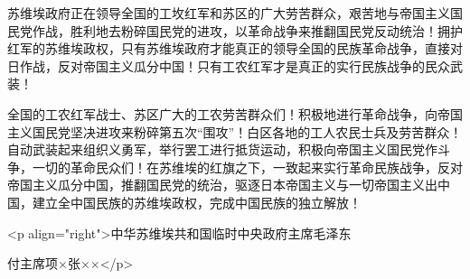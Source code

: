 苏维埃政府正在领导全国的工坆红军和苏区的广大劳苦群众，艰苦地与帝国主义国民党作战，胜利地去粉碎国民党的进攻，以革命战争来推翻国民党反动统治！拥护红军的苏维埃政权，只有苏维埃政府才能真正的领导全国的民族革命战争，直接对日作战，反对帝国主义瓜分中国！只有工农红军才是真正的实行民族战争的民众武装！

全国的工农红军战士、苏区广大的工农劳苦群众们！积极地进行革命战争，向帝国主义国民党坚决进攻来粉碎第五次“围攻”！白区各地的工人农民士兵及劳苦群众！自动武装起来组织义勇军，举行罢工进行抵货运动，积极向帝国主义国民党作斗争，一切的革命民众们！在苏维埃的红旗之下，一致起来实行革命民族战争，反对帝国主义瓜分中国，推翻国民党的统治，驱逐日本帝国主义与一切帝国主义出中国，建立全中国民族的苏维埃政权，完成中国民族的独立解放！

<p align="right">中华苏维埃共和国临时中央政府主席毛泽东

付主席项×张××</p>


